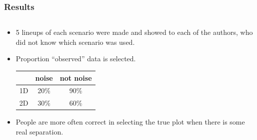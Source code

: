 \documentclass{beamer}
\begin{document}
\begin{frame}
  \frametitle{Results}
	\begin{columns}
		\begin{column}{0.45\textwidth}
		  \begin{itemize}
			  \item 5 lineups of each scenario were made and showed to each of the authors, who did not know which scenario was used.
		\item Proportion ``observed'' data is selected.
		\begin{table}[ht]
		\begin{center}
		\begin{tabular}{c|cc}
  		\hline
 		& noise & not noise\\
 	 	\hline
		1D &  20\% & 90\% \\ 
		2D &  30\% & 60\% \\
   		\hline
		\end{tabular}
		\end{center}
		\end{table}
	
			 \item People are more often correct in selecting the true plot when there is some real separation.
		  \end{itemize}		
			
		\end{column}
		

\end{columns}
\end{frame}
\end{document}
